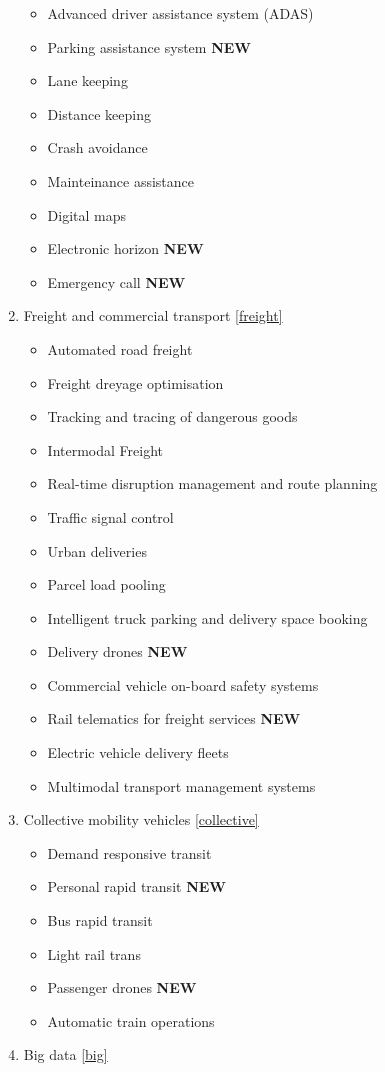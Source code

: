 \documentclass[
]{book}
\providecommand{\tightlist}{%
  \setlength{\itemsep}{0pt}\setlength{\parskip}{0pt}}
\begin{document}
\begin{enumerate}
  \begin{itemize}
  \tightlist
  \item
    Advanced driver assistance system (ADAS)
  \item
    Parking assistance system \textbf{NEW}
  \item
    Lane keeping
  \item
    Distance keeping
  \item
    Crash avoidance
  \item
    Mainteinance assistance
  \item
    Digital maps
  \item
    Electronic horizon \textbf{NEW}
  \item
    Emergency call \textbf{NEW}
  \end{itemize}
\item
  Freight and commercial transport \ref{freight}

  \begin{itemize}
  \tightlist
  \item
    Automated road freight
  \item
    Freight dreyage optimisation
  \item
    Tracking and tracing of dangerous goods
  \item
    Intermodal Freight
  \item
    Real-time disruption management and route planning
  \item
    Traffic signal control
  \item
    Urban deliveries
  \item
    Parcel load pooling
  \item
    Intelligent truck parking and delivery space booking
  \item
    Delivery drones \textbf{NEW}
  \item
    Commercial vehicle on-board safety systems
  \item
    Rail telematics for freight services \textbf{NEW}
  \item
    Electric vehicle delivery fleets
  \item
    Multimodal transport management systems
  \end{itemize}
\item
  Collective mobility vehicles \ref{collective}

  \begin{itemize}
  \tightlist
  \item
    Demand responsive transit
  \item
    Personal rapid transit \textbf{NEW}
  \item
    Bus rapid transit
  \item
    Light rail trans
  \item
    Passenger drones \textbf{NEW}
  \item
    Automatic train operations
  \end{itemize}
\item
  Big data \ref{big}


\end{enumerate}
\end{document}
